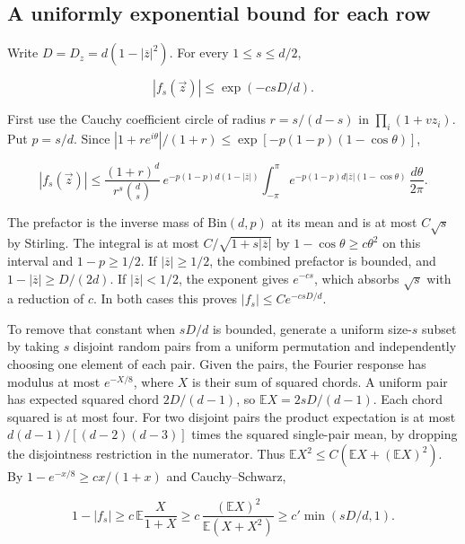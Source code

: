 \subsection{A uniformly exponential bound for each row}

Write $D=D_z=d(1-|\overline z|^2)$. For every $1\le s\le d/2$,

\begin{equation}
|f_s(\vec z)|\le \exp(-c sD/d).
\tag{G1}
\end{equation}

First use the Cauchy coefficient circle of radius $r=s/(d-s)$ in $\prod_i(1+v z_i)$. Put $p=s/d$. Since $|1+r e^{i\theta}|/(1+r)\le \exp[-p(1-p)(1-\cos\theta)]$,

\begin{equation*}
|f_s(\vec z)|
\le
\frac{(1+r)^d}{r^s\binom ds}
\,e^{-p(1-p)d(1-|\overline z|)}
\int_{-\pi}^{\pi}e^{-p(1-p)d|\overline z|(1-\cos\theta)}
                    \,\frac{d\theta}{2\pi}.
\end{equation*}

The prefactor is the inverse mass of $\mathrm{Bin}(d,p)$ at its mean and is at most $C\sqrt s$ by Stirling. The integral is at most $C/\sqrt{1+s|\overline z|}$ by $1-\cos\theta\ge c\theta^2$ on this interval and $1-p\ge1/2$. If $|\overline z|\ge1/2$, the combined prefactor is bounded, and $1-|\overline z|\ge D/(2d)$. If $|\overline z|<1/2$, the exponent gives $e^{-cs}$, which absorbs $\sqrt s$ with a reduction of $c$. In both cases this proves $|f_s|\le C e^{-c sD/d}$.

To remove that constant when $sD/d$ is bounded, generate a uniform size-$s$ subset by taking $s$ disjoint random pairs from a uniform permutation and independently choosing one element of each pair. Given the pairs, the Fourier response has modulus at most $e^{-X/8}$, where $X$ is their sum of squared chords. A uniform pair has expected squared chord $2D/(d-1)$, so $\mathbb EX=2sD/(d-1)$. Each chord squared is at most four. For two disjoint pairs the product expectation is at most $d(d-1)/[(d-2)(d-3)]$ times the squared single-pair mean, by dropping the disjointness restriction in the numerator. Thus $\mathbb E X^2\le C(\mathbb EX+(\mathbb EX)^2)$. By $1-e^{-x/8}\ge c x/(1+x)$ and Cauchy--Schwarz,

\begin{equation*}
1-|f_s|\ge c\,\mathbb E\frac{X}{1+X}
\ge c\,\frac{(\mathbb EX)^2}{\mathbb E(X+X^2)}
\ge c'\min(sD/d,1).
\end{equation*}

